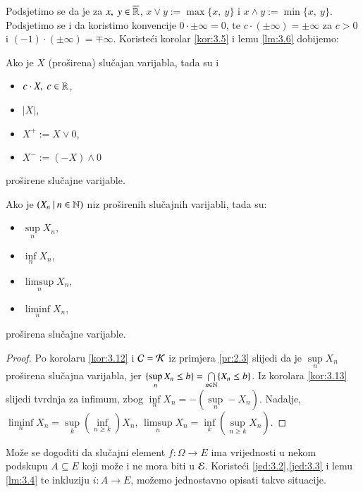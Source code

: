 Podsjetimo se da je za $x, \; y \in \overline{\mathbb{R}}$, $x \lor y := \max \{x, \: y\}$ i $x \land y := \min \{x, \: y\}$.
Podsjetimo se i da koristimo konvencije $0 \cdot \pm \infty = 0$, te $c \cdot (\pm \infty) = \pm \infty$ za $c > 0$ i $(-1) \cdot (\pm \infty) = \mp \infty$. Koriste\' ci korolar \ref{kor:3.5} i lemu \ref{lm:3.6} dobijemo:

\begin{kor} \label{kor:3.13}
    Ako je $X$ (pro\v sirena) slu\v cajan varijabla, tada su i
    \begin{itemize}[label=]
        \item $c \cdot X, \; c \in \mathbb{R}$,
        \item $|X|$,
        \item $X^+ := X \lor 0$,
        \item $X^- := (-X) \land 0$
    \end{itemize}
    pro\v sirene slu\v cajne varijable.
\end{kor}

\begin{kor} \label{kor:3.14}
    Ako je $({X_n} \: | \: {n \in \mathbb{N}})$ niz pro\v sirenih slu\v cajnih varijabli, tada su:
    \begin{itemize}[label=]
        \item $\sup\limits_{n} X_n$,
        \item $\inf\limits_{n} X_n$,
        \item $\limsup\limits_{n} X_n$,
        \item $\liminf\limits_{n} X_n$,
    \end{itemize}
    pro\v sirena slu\v cajne varijable.
\end{kor}

\begin{proof}
    Po korolaru \ref{kor:3.12} i $\mathcal{C} = \mathcal{K}$ iz primjera \ref{pr:2.3} slijedi da je $\sup\limits_n X_n$ pro\v sirena slu\v cajna varijabla, jer $\{ \sup\limits_n X_n \leq b \} = \bigcap\limits_{n \in \mathbb{N}}^{} \{ X_n \leq b \}$.
    Iz korolara \ref{kor:3.13} slijedi tvrdnja za infimum, zbog $\inf\limits_n X_n = - (\sup\limits_n - X_n)$.
    Nadalje, $\liminf\limits_n X_n = \sup\limits_k (\inf\limits_{n \geq k}) X_n$, $\limsup\limits_n X_n = \inf\limits_k (\sup\limits_{n\geq k} X_n)$.
\end{proof}

Mo\v ze se dogoditi da slu\v cajni element $f:\Omega \to E$ ima vrijednosti u nekom podskupu $A \subseteq E$ koji mo\v ze i ne mora biti u $\mathcal{E}$. Koriste\' ci \eqref{jed:3.2},\eqref{jed:3.3} i lemu \ref{lm:3.4} te inkluziju $i: A \to E$, mo\v zemo jednostavno opisati takve situacije.

